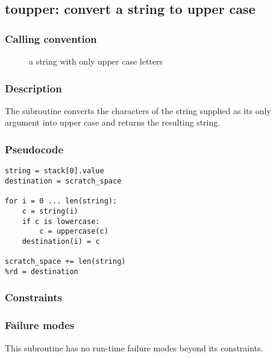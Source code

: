 \clearpage
{}
{}
\label{subr:toupper}
\subsection*{toupper: convert a string to upper case}

\subsubsection*{Calling convention}

\begin{description}
\item[] a string with only upper case letters
\end{description}

\subsubsection*{Description}

The  subroutine converts the characters of the
string supplied as its only argument into upper case and returns the
resulting string.

\subsubsection*{Pseudocode}

\begin{verbatim}
string = stack[0].value
destination = scratch_space

for i = 0 ... len(string):
    c = string(i)
    if c is lowercase:
        c = uppercase(c)
    destination(i) = c

scratch_space += len(string)
%rd = destination
\end{verbatim}

\subsubsection*{Constraints}

\subsubsection*{Failure modes}

This subroutine has no run-time failure modes beyond its constraints.

